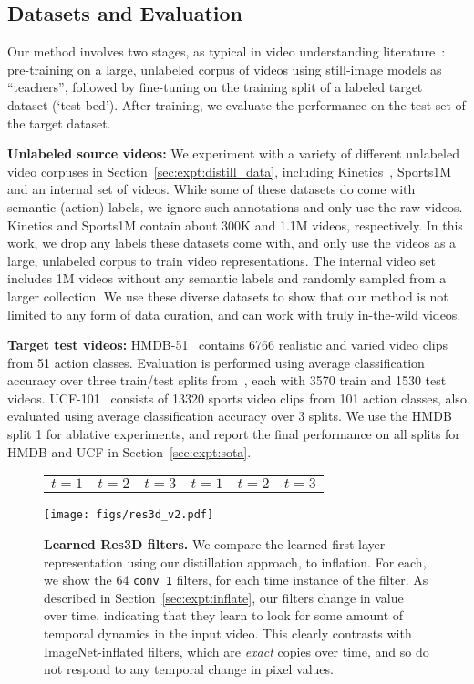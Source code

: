 \documentclass[10pt,twocolumn,letterpaper]{article}
\begin{document}
\subsection{Datasets and Evaluation}\label{sec:expt:data}

Our method involves two stages, as typical in video understanding literature~\cite{carreira2017quo}: pre-training on a large, unlabeled corpus of videos using still-image models as ``teachers'', followed by fine-tuning on the training split of a labeled target dataset (`test bed'). After training, we evaluate the performance
on the test set of the target dataset. 

{\noindent \bf Unlabeled source videos:} We experiment with a variety of different unlabeled video corpuses in Section~\ref{sec:expt:distill_data}, including Kinetics~\cite{kay2017kinetics}, Sports1M~\cite{Karpathy_14} 
and an internal set of videos.
While some of these datasets do come with semantic (action) labels, we ignore such annotations and only use the raw videos.
Kinetics
and Sports1M contain about 300K
and 1.1M videos, respectively.
In this work, we drop any labels these datasets come with, and only use the videos as a large, unlabeled corpus to train video representations.
The internal video set includes 1M videos without any semantic labels and randomly sampled from a larger collection. We use these diverse datasets to show that our method is not limited to any form of data curation, and can work with truly in-the-wild videos.

{\noindent \bf Target test videos:} HMDB-51~\cite{hmdb51} contains 6766 realistic and varied video clips from 51 action classes. Evaluation is
performed using average classification accuracy over three train/test splits from~\cite{THUMOS13}, each with 3570
train and 1530 test videos. UCF-101~\cite{ucf101} consists of 13320 sports video clips from 101 action classes,
also evaluated using average classification accuracy over 3 splits. We use the HMDB split 1 for ablative experiments, and report the final
performance on all splits for HMDB and UCF in Section~\ref{sec:expt:sota}. 


\begin{figure*}[t]
    \centering
    \begin{tabularx}{\linewidth}{YYY@{\hskip 1cm}YYY}
    $t=1$ & $t=2$ & $t=3$ & $t=1$ & $t=2$ & $t=3$
    \end{tabularx}
    \texttt{[image: figs/res3d\_v2.pdf]}
    \caption{
    {\bf Learned Res3D filters.}
    We compare the learned first layer representation using our distillation approach, to inflation.
    For each, we show the 64 \texttt{conv\_1} filters, for each time instance of the filter.
    As described in Section~\ref{sec:expt:inflate}, our filters change in value over time, indicating that they learn to look for some amount of temporal dynamics in the input video. This clearly contrasts with ImageNet-inflated filters, which are {\em exact} copies over time, and so do not respond to any temporal change in pixel values.
    }
    \label{fig:filters_res3d}
\end{figure*}
\end{document}
